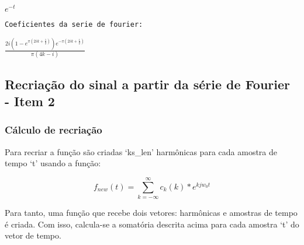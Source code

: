 \documentclass{article}
\begin{document}
    $\displaystyle e^{- t}$

    
    \begin{Verbatim}[commandchars=\\\{\}]
Coeficientes da serie de fourier:
    \end{Verbatim}

    $\displaystyle \frac{2 i \left(1 - e^{\pi \left(2 i k + \frac{1}{2}\right)}\right) e^{- \pi \left(2 i k + \frac{1}{2}\right)}}{\pi \left(4 k - i\right)}$

    
    \hypertarget{recriauxe7uxe3o-do-sinal-a-partir-da-suxe9rie-de-fourier---item-2}{%
\subsection{Recriação do sinal a partir da série de Fourier - Item
2}\label{recriauxe7uxe3o-do-sinal-a-partir-da-suxe9rie-de-fourier---item-2}}

    \hypertarget{cuxe1lculo-de-recriauxe7uxe3o}{%
\subsubsection{Cálculo de
recriação}\label{cuxe1lculo-de-recriauxe7uxe3o}}

Para recriar a função são criadas `ks\_len' harmônicas para cada amostra
de tempo `t' usando a função:

\[ 
f_{new}(t) =
\sum_{k = -\infty}^{\infty}
c_k(k) * e^{k j w_0 t}
\]

Para tanto, uma função que recebe dois vetores: harmônicas e amostras de
tempo é criada. Com isso, calcula-se a somatória descrita acima para
cada amostra `t' do vetor de tempo.
\end{document}
